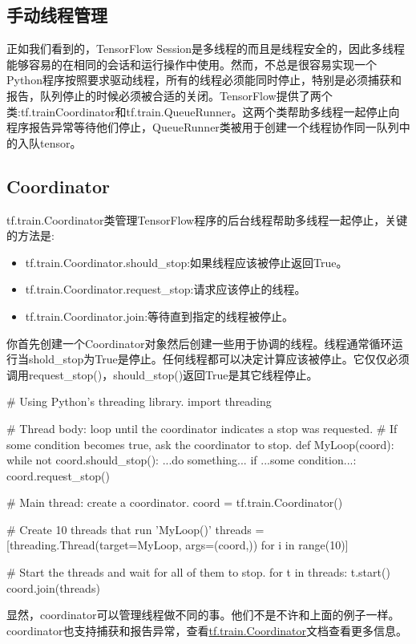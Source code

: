\subsection{手动线程管理}
正如我们看到的，TensorFlow Session是多线程的而且是线程安全的，因此多线程能够容易的在相同的会话和运行操作中使用。然而，不总是很容易实现一个Python程序按照要求驱动线程，所有的线程必须能同时停止，特别是必须捕获和报告，队列停止的时候必须被合适的关闭。TensorFlow提供了两个类:tf.trainCoordinator和tf.train.QueueRunner。这两个类帮助多线程一起停止向程序报告异常等待他们停止，QueueRunner类被用于创建一个线程协作同一队列中的入队tensor。
\subsection{Coordinator}
tf.train.Coordinator类管理TensorFlow程序的后台线程帮助多线程一起停止，关键的方法是:
\begin{itemize}
	\item tf.train.Coordinator.should\_stop:如果线程应该被停止返回True。
	\item tf.train.Coordinator.request\_stop:请求应该停止的线程。
	\item tf.train.Coordinator.join:等待直到指定的线程被停止。
\end{itemize}
你首先创建一个Coordinator对象然后创建一些用于协调的线程。线程通常循环运行当shold\_stop为True是停止。任何线程都可以决定计算应该被停止。它仅仅必须调用request\_stop()，should\_stop()返回True是其它线程停止。
\begin{python}
# Using Python's threading library.
import threading

# Thread body: loop until the coordinator indicates a stop was requested.
# If some condition becomes true, ask the coordinator to stop.
def MyLoop(coord):
    while not coord.should_stop():
    ...do something...
    if ...some condition...:
        coord.request_stop()

# Main thread: create a coordinator.
coord = tf.train.Coordinator()

# Create 10 threads that run 'MyLoop()'
threads = [threading.Thread(target=MyLoop, args=(coord,)) for i in range(10)]

# Start the threads and wait for all of them to stop.
for t in threads:
  t.start()
coord.join(threads)
\end{python}
显然，coordinator可以管理线程做不同的事。他们不是不许和上面的例子一样。coordinator也支持捕获和报告异常，查看\href{https://www.tensorflow.org/api_docs/python/tf/train/Coordinator}{tf.train.Coordinator}文档查看更多信息。
